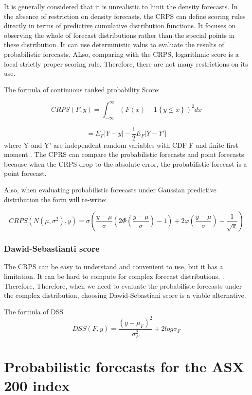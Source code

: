 \documentclass{monashthesis}
\theoremstyle{definition}
\theoremstyle{definition}
\theoremstyle{definition}
\theoremstyle{remark}
\begin{document}
It is generally considered that it is unrealistic to limit the density
forecasts. In the absence of restriction on density forecasts, the CRPS
can define scoring rules directly in terms of predictive cumulative
distribution functions. It focuses on observing the whole of forecast
distributions rather than the special points in these distribution. It
can use deterministic valus to evaluate the results of probabilistic
forecasts. ALso, comparing with the CRPS, logarithmic score is a local
strictly proper scoring rule. Therefore, there are not many restrictions
on its use.

The formula of continuous ranked probability Score:

\[
       CRPS(F,y)=\int_{-\infty}^{\infty}(F(x)-1\left\{y\leq{x}\right\})^2 dx
   \]

\[
    = E_F|Y-y|-\frac{1}{2}E_F|Y-Y'|
  \] where Y and Y' are independent random variables with CDF F and
finite first moment \textcite{GR07}. The CPRS can compare the
probabilistic forecasts and point forecasts because when the CRPS drop
to the absolute error, the probabilistic forecast is a point forecast.
\textcite{GK14}

Also, when evaluating probabilistic forecasts under Gaussian predictive
distribution the form will re-write:

\[
       CRPS(N(\mu,\sigma^2),y)=\sigma\left(\frac{y-\mu}{\sigma}\left(2\Phi\left(\frac{y-\mu}{\sigma}\right)-1\right)+2\varphi\left(\frac{y-\mu}{\sigma}\right)-\frac{1}{\sqrt{\pi}}\right)
  \]

\subsection{Dawid-Sebastianti score}\label{dawid-sebastianti-score}

The CRPS can be easy to understand and convenient to use, but it has a
limitation. It can be hard to compute for complex forecast
distributions. \textcite{GK14}. Therefore, Therefore, when we need to
evaluate the probabilistc forecasts under the complex distribution,
choosing Dawid-Sebastiani score is a viable alternative.

The formula of DSS \[
     DSS(F,y)=\frac{(y-\mu_F)^2}{\sigma_F^2}+2log\sigma_F
  \]

\chapter{Probabilistic forecasts for the ASX 200
index}\label{probabilistic-forecasts-for-the-asx-200-index}
\end{document}
